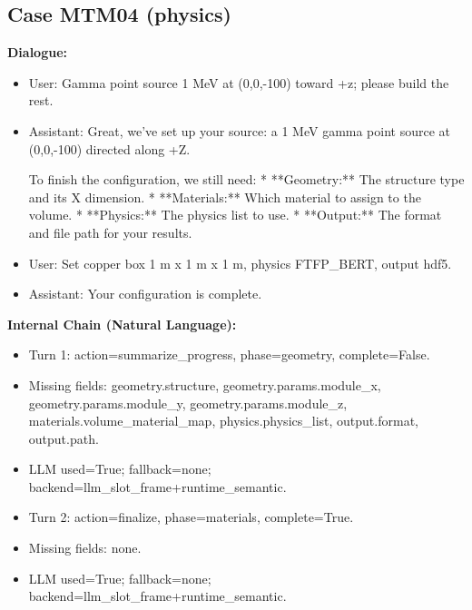 \documentclass[11pt]{ctexart}
\begin{document}
\subsection{Case MTM04 (physics)}
\textbf{Dialogue:}
\begin{itemize}
\item User: Gamma point source 1 MeV at (0,0,-100) toward +z; please build the rest.
\item Assistant: Great, we've set up your source: a 1 MeV gamma point source at (0,0,-100) directed along +Z.

To finish the configuration, we still need:
*   **Geometry:** The structure type and its X dimension.
*   **Materials:** Which material to assign to the volume.
*   **Physics:** The physics list to use.
*   **Output:** The format and file path for your results.
\item User: Set copper box 1 m x 1 m x 1 m, physics FTFP\_BERT, output hdf5.
\item Assistant: Your configuration is complete.
\end{itemize}
\textbf{Internal Chain (Natural Language):}
\begin{itemize}
\item Turn 1: action=summarize\_progress, phase=geometry, complete=False.
\item Missing fields: geometry.structure, geometry.params.module\_x, geometry.params.module\_y, geometry.params.module\_z, materials.volume\_material\_map, physics.physics\_list, output.format, output.path.
\item LLM used=True; fallback=none; backend=llm\_slot\_frame+runtime\_semantic.
\item Turn 2: action=finalize, phase=materials, complete=True.
\item Missing fields: none.
\item LLM used=True; fallback=none; backend=llm\_slot\_frame+runtime\_semantic.
\end{itemize}
\end{document}

